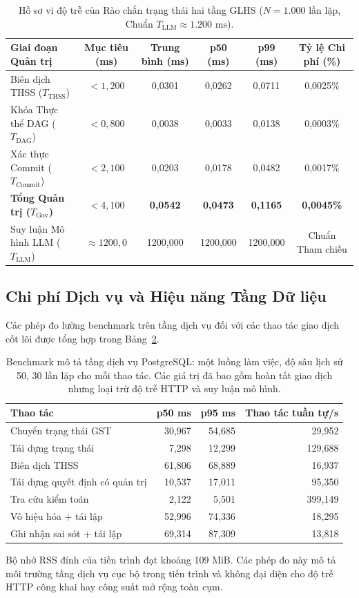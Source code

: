 \documentclass[11pt]{article}
\begin{document}
\begin{table}[H]
\centering
\small
\caption{Hồ sơ vi độ trễ của Rào chắn trạng thái hai tầng GLHS ($N=1.000$ lần lặp, Chuẩn $T_{\text{LLM}} \approx 1.200\text{ ms}$).}
\label{tab:glhs_governance_microbench_vi}
\begin{tabularx}{\textwidth}{l c c c c c}
\toprule
\textbf{Giai đoạn Quản trị} & \textbf{Mục tiêu (ms)} & \textbf{Trung bình (ms)} & \textbf{p50 (ms)} & \textbf{p99 (ms)} & \textbf{Tỷ lệ Chi phí (\%)} \\
\midrule
Biên dịch THSS ($T_{\text{THSS}}$) & $< 1{,}200$ & 0,0301 & 0,0262 & 0,0711 & 0,0025\% \\
Khóa Thực thể DAG ($T_{\text{DAG}}$) & $< 0{,}800$ & 0,0038 & 0,0033 & 0,0138 & 0,0003\% \\
Xác thực Commit ($T_{\text{Commit}}$) & $< 2{,}100$ & 0,0203 & 0,0178 & 0,0482 & 0,0017\% \\
\midrule
\textbf{Tổng Quản trị ($T_{\text{Gov}}$)} & \textbf{$< 4{,}100$} & \textbf{0,0542} & \textbf{0,0473} & \textbf{0,1165} & \textbf{0,0045\%} \\
Suy luận Mô hình LLM ($T_{\text{LLM}}$) & $\approx 1200{,}0$ & 1200,000 & 1200,000 & 1200,000 & Chuẩn Tham chiếu \\
\bottomrule
\end{tabularx}
\end{table}

\subsection{Chi phí Dịch vụ và Hiệu năng Tầng Dữ liệu}
Các phép đo lường benchmark trên tầng dịch vụ đối với các thao tác giao dịch cốt lõi được tổng hợp trong Bảng~\ref{tab:perf_vi}.

\begin{table}[H]
\centering
\small
\caption{Benchmark mô tả tầng dịch vụ PostgreSQL: một luồng làm việc, độ sâu lịch sử 50, 30 lần lặp cho mỗi thao tác. Các giá trị đã bao gồm hoàn tất giao dịch nhưng loại trừ độ trễ HTTP và suy luận mô hình.}
\label{tab:perf_vi}
\begin{tabular}{lrrr}
\toprule
\textbf{Thao tác} & \textbf{p50 ms} & \textbf{p95 ms} & \textbf{Thao tác tuần tự/s}\\
\midrule
Chuyển trạng thái GST & 30{,}967 & 54{,}685 & 29{,}952\\
Tái dựng trạng thái & 7{,}298 & 12{,}299 & 129{,}688\\
Biên dịch THSS & 61{,}806 & 68{,}889 & 16{,}937\\
Tái dựng quyết định có quản trị & 10{,}537 & 17{,}011 & 95{,}350\\
Tra cứu kiểm toán & 2{,}122 & 5{,}501 & 399{,}149\\
Vô hiệu hóa + tái lập & 52{,}996 & 74{,}336 & 18{,}295\\
Ghi nhận sai sót + tái lập & 69{,}314 & 87{,}309 & 13{,}818\\
\bottomrule
\end{tabular}
\end{table}
Bộ nhớ RSS đỉnh của tiến trình đạt khoảng 109 MiB. Các phép đo này mô tả môi trường tầng dịch vụ cục bộ trong tiến trình và không đại diện cho độ trễ HTTP công khai hay công suất mở rộng toàn cụm.
\end{document}
